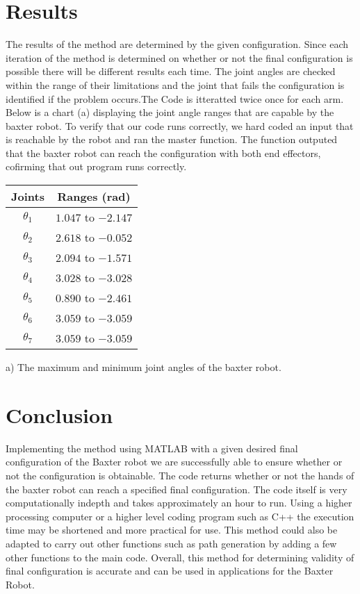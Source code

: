 \documentclass[11pt]{article}
\begin{document}
\section{Results}
The results of the method are determined by the given configuration. Since each iteration of the method is determined on whether or not the final configuration is possible there will be different results each time. The joint angles are checked within the range of their limitations and the joint that fails the configuration is identified if the problem occurs.The Code is itteratted twice once for each arm. Below is a chart (a) displaying the joint angle ranges that are capable by the baxter robot. To verify that our code runs correctly, we hard coded an input that is reachable by the robot and ran the master function. The function outputed that the baxter robot can reach the configuration with both end effectors, cofirming that out program runs correctly.
\\

{
\begin{center}
\begin{tabular}{|c|c|}
  \hline
  Joints & Ranges (rad)\\
  \hline
  $\theta_1$ & $1.047$ to $-2.147$ \\
  \hline
  $\theta_2$ & $2.618$ to $-0.052$ \\
  \hline
  $\theta_3$ & $2.094$ to $-1.571$ \\
  \hline
  $\theta_4$ & $3.028$ to $-3.028$ \\
  \hline
  $\theta_5$ & $0.890$ to $-2.461$ \\
  \hline
  $\theta_6$ & $3.059$ to $-3.059$ \\
  \hline
  $\theta_7$ & $3.059$ to $-3.059$ \\
  \hline
\end{tabular}
\end{center}
a) The maximum and minimum joint angles of the baxter robot.
}

\section{Conclusion}
Implementing the method using MATLAB with a given desired final configuration of the Baxter robot we are successfully able to ensure whether or not the configuration is obtainable. The code returns whether or not the hands of the baxter robot can reach a specified final configuration. The code itself is very computationally indepth and takes approximately an hour to run. Using a higher processing computer or a higher level coding program such as C++ the execution time may be shortened and more practical for use. This method could also be adapted to carry out other functions such as path generation by adding a few other functions to the main code. Overall, this method for determining validity of final configuration is accurate and can be used in applications for the Baxter Robot.
\end{document}
